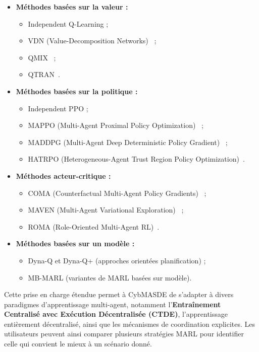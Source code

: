 \begin{itemize}
    \item \textbf{Méthodes basées sur la valeur :}
    \begin{itemize}
        \item Independent Q-Learning ;
        \item VDN (Value-Decomposition Networks)~\cite{sunehag2018vdn} ;
        \item QMIX~\cite{rashid2018qmix} ;
        \item QTRAN~\cite{son2019qtran}.
    \end{itemize}
    
    \item \textbf{Méthodes basées sur la politique :}
    \begin{itemize}
        \item Independent PPO ;
        \item MAPPO (Multi-Agent Proximal Policy Optimization)~\cite{yu2021mappo} ;
        \item MADDPG (Multi-Agent Deep Deterministic Policy Gradient)~\cite{lowe2017multi} ;
        \item HATRPO (Heterogeneous-Agent Trust Region Policy Optimization)~\cite{kuba2021trust}.
    \end{itemize}
    
    \item \textbf{Méthodes acteur-critique :}
    \begin{itemize}
        \item COMA (Counterfactual Multi-Agent Policy Gradients)~\cite{foerster2018counterfactual} ;
        \item MAVEN (Multi-Agent Variational Exploration)~\cite{mahajan2019maven} ;
        \item ROMA (Role-Oriented Multi-Agent RL)~\cite{wang2020roma}.
    \end{itemize}
    
    \item \textbf{Méthodes basées sur un modèle :}
    \begin{itemize}
        \item Dyna-Q et Dyna-Q+ (approches orientées planification) ;
        \item MB-MARL (variantes de MARL basées sur modèle).
    \end{itemize}
\end{itemize}

Cette prise en charge étendue permet à CybMASDE de s'adapter à divers paradigmes d'apprentissage multi-agent, notamment l'\textbf{Entraînement Centralisé avec Exécution Décentralisée (CTDE)}, l'apprentissage entièrement décentralisé, ainsi que les mécanismes de coordination explicites. Les utilisateurs peuvent ainsi comparer plusieurs stratégies MARL pour identifier celle qui convient le mieux à un scénario donné.

